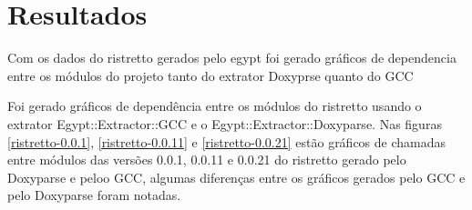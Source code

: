 \section{Resultados}

Com os dados do ristretto gerados pelo egypt foi gerado gráficos de dependencia
entre os módulos do projeto tanto do extrator Doxyprse quanto do GCC

Foi gerado gráficos de dependência entre os módulos do ristretto usando o
extrator Egypt::Extractor::GCC e o Egypt::Extractor::Doxyparse. Nas figuras
\ref{ristretto-0.0.1}, \ref{ristretto-0.0.11} e \ref{ristretto-0.0.21} estão
gráficos de chamadas entre módulos das versões 0.0.1, 0.0.11 e 0.0.21 do
ristretto gerado pelo Doxyparse e peloo GCC, algumas diferenças entre os
gráficos gerados pelo GCC e pelo Doxyparse foram notadas. 

